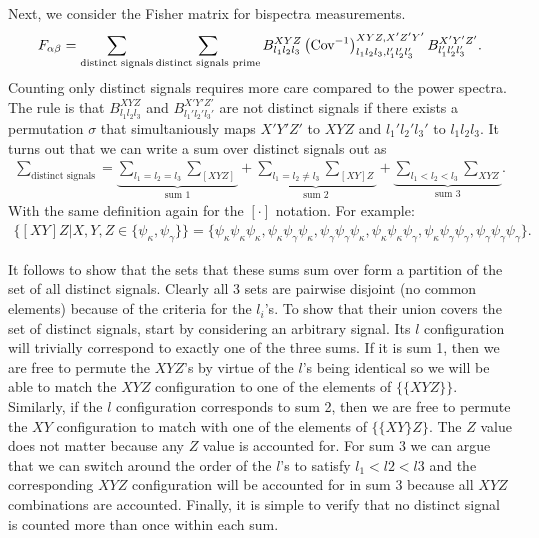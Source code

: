 \documentclass[11pt]{article} %
\DeclareRobustCommand{\Cov}{\ifmmode\text{Cov}\else d\fi}
\newcommand{\br}[1]{\ensuremath{\left( #1 \right)}}
\begin{document}
Next, we consider the Fisher matrix for bispectra measurements.
\begin{equation*}
    F_{\alpha\beta} = \sum_{\text{distinct signals}}\sum_{\text{distinct signals prime}} B^{XYZ}_{l_1l_2l_3}\br{\Cov^{-1}}^{XYZ,X'Z'Y'}_{l_1l_2l_3,l_1'l_2'l_3'}B^{X'Y'Z'}_{l_1'l_2'l_3'}.
\end{equation*} 
Counting only distinct signals requires more care compared to the power spectra. The rule is that $B^{XYZ}_{l_1l_2l_3}$ and $B^{X'Y'Z'}_{l_1'l_2'l_3'}$ are not distinct signals if there exists a permutation $\sigma$ that simultaniously maps $X'Y'Z'$ to $XYZ$ and $l_1'l_2'l_3'$ to $l_1l_2l_3$. It turns out that we can write a sum over distinct signals out as
\begin{gather*}
    \sum_{\text{distinct signals}} = \underbrace{\sum_{l_1=l_2=l_3}\sum_{[XYZ]}}_{\text{sum }1} + \underbrace{\sum_{l_1=l_2\neq l_3}\sum_{[XY]Z}}_{\text{sum }2} + \underbrace{\sum_{l_1<l_2<l_3}\sum_{XYZ}}_{\text{sum }3}.
\end{gather*}
With the same definition again for the $[\cdot]$ notation. For example:
\begin{gather*}
    \{[XY]Z|X,Y,Z\in\{\psi_\kappa, \psi_\gamma\}\} = \{\psi_\kappa\psi_\kappa\psi_\kappa, \psi_\kappa\psi_\gamma\psi_\kappa, \psi_\gamma\psi_\gamma\psi_\kappa,\psi_\kappa\psi_\kappa\psi_\gamma, \psi_\kappa\psi_\gamma\psi_\gamma, \psi_\gamma\psi_\gamma\psi_\gamma\}.
\end{gather*}

It follows to show that the sets that these sums sum over form a partition of the set of all distinct signals. Clearly all 3 sets are pairwise disjoint (no common elements) because of the criteria for the $l_i$'s. To show that their union covers the set of distinct signals, start by considering an arbitrary signal. Its $l$ configuration will trivially correspond to exactly one of the three sums. If it is sum 1, then we are free to permute the $XYZ$'s by virtue of the $l$'s being identical so we will be able to match the $XYZ$ configuration to one of the elements of $\{\{XYZ\}\}$. Similarly, if the $l$ configuration corresponds to sum 2, then we are free to permute the $XY$ configuration to match with one of the elements of $\{\{XY\}Z\}$. The $Z$ value does not matter because any $Z$ value is accounted for. For sum 3 we can argue that we can switch around the order of the $l$'s to satisfy $l_1 < l2 < l3$ and the corresponding $XYZ$ configuration will be accounted for in sum 3 because all $XYZ$ combinations are accounted. Finally, it is simple to verify that no distinct signal is counted more than once within each sum.
\end{document}
